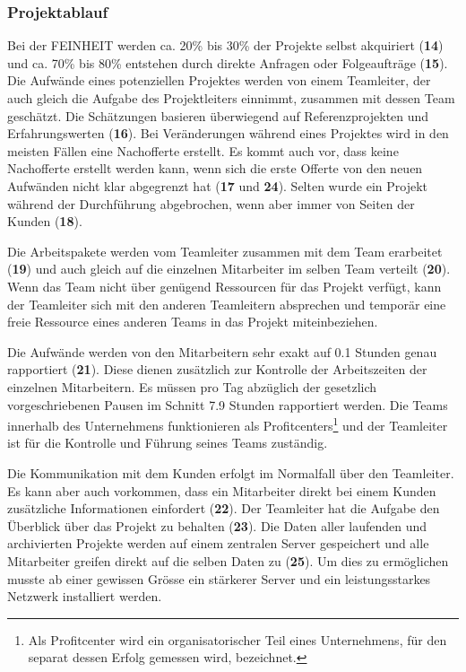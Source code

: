 \subsubsection{Projektablauf}
Bei der FEINHEIT werden ca. 20\% bis 30\% der Projekte selbst akquiriert (\textbf{14})
und ca. 70\% bis 80\% entstehen durch direkte Anfragen oder Folgeaufträge (\textbf{15}).
Die Aufwände eines potenziellen Projektes werden von einem Teamleiter, der auch
gleich die Aufgabe des Projektleiters einnimmt, zusammen mit dessen Team geschätzt.
Die Schätzungen basieren überwiegend auf Referenzprojekten und Erfahrungswerten (\textbf{16}).
Bei Veränderungen während eines Projektes wird in den meisten Fällen eine Nachofferte
erstellt. Es kommt auch vor, dass keine Nachofferte erstellt werden kann, wenn 
sich die erste Offerte von den neuen Aufwänden nicht klar abgegrenzt hat (\textbf{17} und \textbf{24}).
Selten wurde ein Projekt während der Durchführung abgebrochen, wenn aber immer
von Seiten der Kunden (\textbf{18}).

Die Arbeitspakete werden vom Teamleiter zusammen mit dem Team erarbeitet (\textbf{19})
und auch gleich auf die einzelnen Mitarbeiter im selben Team verteilt (\textbf{20}).
Wenn das Team nicht über genügend Ressourcen für das Projekt verfügt, kann der
Teamleiter sich mit den anderen Teamleitern absprechen und temporär eine freie
Ressource eines anderen Teams in das Projekt miteinbeziehen.

Die Aufwände werden von den Mitarbeitern sehr exakt auf 0.1 Stunden genau 
rapportiert (\textbf{21}). Diese dienen zusätzlich zur Kontrolle der Arbeitszeiten
der einzelnen Mitarbeitern. Es müssen pro Tag abzüglich der gesetzlich 
vorgeschriebenen Pausen im Schnitt 7.9 Stunden rapportiert werden. Die Teams
innerhalb des Unternehmens funktionieren als Profitcenters\footnote{Als Profitcenter
wird ein organisatorischer Teil eines Unternehmens, für den separat dessen Erfolg
gemessen wird, bezeichnet.} und der Teamleiter ist für die Kontrolle und Führung 
seines Teams zuständig.

Die Kommunikation mit dem Kunden erfolgt im Normalfall über den Teamleiter. Es
kann aber auch vorkommen, dass ein Mitarbeiter direkt bei einem Kunden zusätzliche
Informationen einfordert (\textbf{22}). Der Teamleiter hat die Aufgabe den 
Überblick über das Projekt zu behalten (\textbf{23}). Die Daten aller laufenden
und archivierten Projekte werden auf einem zentralen Server gespeichert und alle
Mitarbeiter greifen direkt auf die selben Daten zu (\textbf{25}). Um dies zu 
ermöglichen musste ab einer gewissen Grösse ein stärkerer Server und ein 
leistungsstarkes Netzwerk installiert werden.

